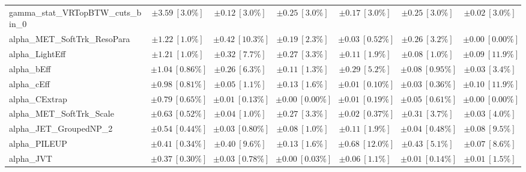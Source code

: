 \begin{sidewaystable}
\begin{center}
\begin{tabular*}{\textwidth}{@{\extracolsep{\fill}}lcccccc}
gamma\_stat\_VRTopBTW\_cuts\_bin\_0         & $\pm 3.59\ [3.0\%] $          & $\pm 0.12\ [3.0\%] $          & $\pm 0.25\ [3.0\%] $          & $\pm 0.17\ [3.0\%] $          & $\pm 0.25\ [3.0\%] $          & $\pm 0.02\ [3.0\%] $       \\
alpha\_MET\_SoftTrk\_ResoPara         & $\pm 1.22\ [1.0\%] $          & $\pm 0.42\ [10.3\%] $          & $\pm 0.19\ [2.3\%] $          & $\pm 0.03\ [0.52\%] $          & $\pm 0.26\ [3.2\%] $          & $\pm 0.00\ [0.00\%] $       \\
alpha\_LightEff         & $\pm 1.21\ [1.0\%] $          & $\pm 0.32\ [7.7\%] $          & $\pm 0.27\ [3.3\%] $          & $\pm 0.11\ [1.9\%] $          & $\pm 0.08\ [1.0\%] $          & $\pm 0.09\ [11.9\%] $       \\
alpha\_bEff         & $\pm 1.04\ [0.86\%] $          & $\pm 0.26\ [6.3\%] $          & $\pm 0.11\ [1.3\%] $          & $\pm 0.29\ [5.2\%] $          & $\pm 0.08\ [0.95\%] $          & $\pm 0.03\ [3.4\%] $       \\
alpha\_cEff         & $\pm 0.98\ [0.81\%] $          & $\pm 0.05\ [1.1\%] $          & $\pm 0.13\ [1.6\%] $          & $\pm 0.01\ [0.10\%] $          & $\pm 0.03\ [0.36\%] $          & $\pm 0.10\ [11.9\%] $       \\
alpha\_CExtrap         & $\pm 0.79\ [0.65\%] $          & $\pm 0.01\ [0.13\%] $          & $\pm 0.00\ [0.00\%] $          & $\pm 0.01\ [0.19\%] $          & $\pm 0.05\ [0.61\%] $          & $\pm 0.00\ [0.00\%] $       \\
alpha\_MET\_SoftTrk\_Scale         & $\pm 0.63\ [0.52\%] $          & $\pm 0.04\ [1.0\%] $          & $\pm 0.27\ [3.3\%] $          & $\pm 0.02\ [0.37\%] $          & $\pm 0.31\ [3.7\%] $          & $\pm 0.03\ [4.0\%] $       \\
alpha\_JET\_GroupedNP\_2         & $\pm 0.54\ [0.44\%] $          & $\pm 0.03\ [0.80\%] $          & $\pm 0.08\ [1.0\%] $          & $\pm 0.11\ [1.9\%] $          & $\pm 0.04\ [0.48\%] $          & $\pm 0.08\ [9.5\%] $       \\
alpha\_PILEUP         & $\pm 0.41\ [0.34\%] $          & $\pm 0.40\ [9.6\%] $          & $\pm 0.13\ [1.6\%] $          & $\pm 0.68\ [12.0\%] $          & $\pm 0.43\ [5.1\%] $          & $\pm 0.07\ [8.6\%] $       \\
alpha\_JVT         & $\pm 0.37\ [0.30\%] $          & $\pm 0.03\ [0.78\%] $          & $\pm 0.00\ [0.03\%] $          & $\pm 0.06\ [1.1\%] $          & $\pm 0.01\ [0.14\%] $          & $\pm 0.01\ [1.5\%] $       \\

\end{tabular*}
\end{center}
\end{sidewaystable}
